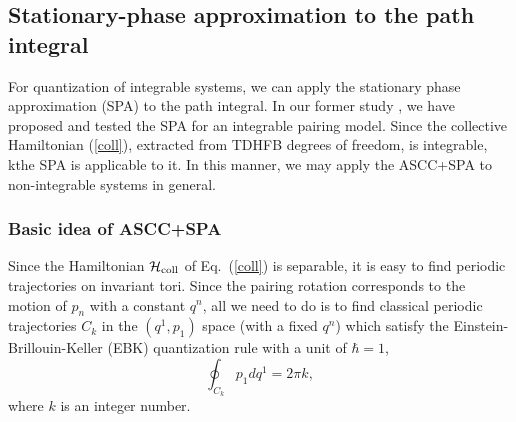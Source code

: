 \documentclass[%
superscriptaddress,
showpacs,
nofootinbib,
amsmath,amssymb,
aps,
prc,
twocolumn,
floatfix ]%
{revtex4-1}
\begin{document}


\subsection{Stationary-phase approximation to the path integral}
\label{sec:SPA}

For quantization of integrable systems,
we can apply the stationary phase approximation (SPA)
to the path integral.
In our former study \cite{NN18},
we have proposed and tested the SPA for an integrable pairing model.
Since the collective Hamiltonian (\ref{coll}),
extracted from TDHFB degrees of freedom, is integrable,
kthe SPA is applicable to it.
In this manner, we may apply the ASCC+SPA to
non-integrable systems in general.


\subsubsection{Basic idea of ASCC+SPA}

Since the Hamiltonian $\mathcal{H}_{\rm coll}$ of Eq.~(\ref{coll})
is separable,
it is easy to find periodic trajectories on invariant tori.
Since the pairing rotation corresponds to the motion of $p_n$
with a constant $q^n$,
all we need to do is to find classical periodic trajectories $C_k$ in
the $(q^1,p_1)$ space (with a fixed $q^n$) which satisfy
the Einstein-Brillouin-Keller (EBK) quantization rule
with a unit of $\hbar=1$,
\begin{equation}
	\oint_{C_k} p_1dq^1 = 2\pi k ,
	\label{EBK}
\end{equation}
where $k$ is an integer number.
\end{document}

